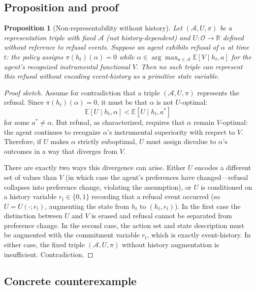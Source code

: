 \documentclass[11pt]{article}
\newtheorem{proposition}{Proposition}
\newcommand{\Act}{\mathcal{A}}
\begin{document}
\subsection{Proposition and proof}

\begin{proposition}[Non-representability without history]
\label{prop:nonrep}
Let $(\Act, U, \pi)$ be a representation triple with fixed $\Act$ (not
history-dependent) and $U: \mathcal{O} \to \mathbb{R}$ defined without
reference to refusal events. Suppose an agent exhibits refusal of $\alpha$ at
time $t$: the policy assigns $\pi(h_t)(\alpha) = 0$ while $\alpha \in
\arg\max_{a \in \Act} \mathbb{E}[V \mid h_t, a]$ for the agent's recognized
instrumental functional $V$. Then no such triple can represent this refusal
without encoding event-history as a primitive state variable.
\end{proposition}

\begin{proof}[Proof sketch]
Assume for contradiction that a triple $(\Act, U, \pi)$ represents the refusal.
Since $\pi(h_t)(\alpha) = 0$, it must be that $\alpha$ is not $U$-optimal:
\[
\mathbb{E}[U \mid h_t, \alpha] < \mathbb{E}[U \mid h_t, a^*]
\]
for some $a^* \neq \alpha$. But refusal, as characterized, requires that
$\alpha$ remain $V$-optimal: the agent continues to recognize $\alpha$'s
instrumental superiority with respect to $V$. Therefore, if $U$ makes $\alpha$
strictly suboptimal, $U$ must assign disvalue to $\alpha$'s outcomes in a way
that diverges from $V$.

There are exactly two ways this divergence can arise. Either $U$ encodes a
different set of values than $V$ (in which case the agent's preferences have
changed---refusal collapses into preference change, violating the assumption),
or $U$ is conditioned on a history variable $r_t \in \{0,1\}$ recording that
a refusal event occurred (so $U = U(\cdot; r_t)$, augmenting the state from
$h_t$ to $(h_t, r_t)$). In the first case the distinction between $U$ and $V$
is erased and refusal cannot be separated from preference change. In the second
case, the action set and state description must be augmented with the commitment
variable $r_t$, which is exactly event-history. In either case, the fixed triple
$(\Act, U, \pi)$ without history augmentation is insufficient. Contradiction.
\end{proof}

\subsection{Concrete counterexample}
\end{document}
